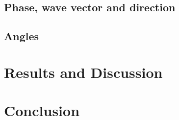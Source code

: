 \documentclass[a4paper,12pt]{article}
\begin{document}
\subsection{Phase, wave vector and direction}

\subsection{Angles}


\section{Results and Discussion}

\section{Conclusion}

\printbibliography
\end{document}
